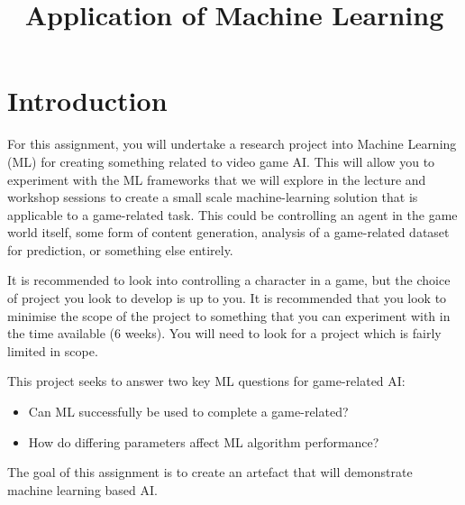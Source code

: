 \documentclass{../fal_assignment}
\title{Application of Machine Learning}
\begin{document}
\maketitle

\section*{Introduction}

%

For this assignment, you will undertake a research project into Machine Learning (ML) for creating something related to video game AI. This will allow you to experiment with the ML frameworks that we will explore in the lecture and workshop sessions to create a small scale machine-learning solution that is applicable to a game-related task. This could be controlling an agent in the game world itself, some form of content generation, analysis of a game-related dataset for prediction, or something else entirely.

It is recommended to look into controlling a character in a game, but the choice of project you look to develop is up to you. It is recommended that you look to minimise the scope of the project to something that you can experiment with in the time available (6 weeks). You will need to look for a project which is fairly limited in scope.

This project seeks to answer two key ML questions for game-related AI:

\begin{itemize}
 \item Can ML successfully be used to complete a game-related?
 \item How do differing parameters affect ML algorithm performance?
\end{itemize}

The goal of this assignment is to create an artefact that will demonstrate machine learning based AI.
\end{document}
